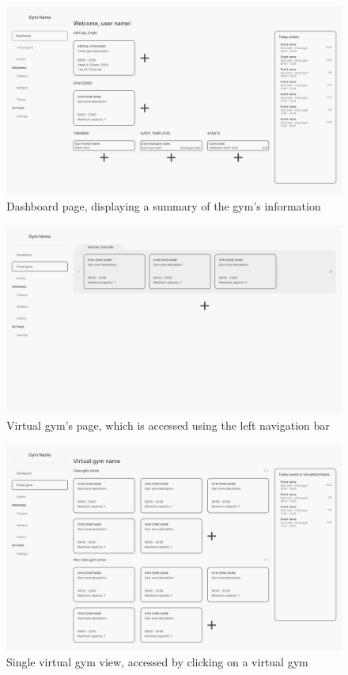 \documentclass[a4paper, 12pt, oneside]{book}
\begin{document}
\begin{figure}[H]
	\centering
	\includegraphics[width=\textwidth]{assets/ui/dashboard.png}
	\caption{Dashboard page, displaying a summary of the gym's information}
\end{figure}
\begin{figure}[H]
	\centering
	\includegraphics[width=\textwidth]{assets/ui/virtual-gyms.png}
	\caption{Virtual gym's page, which is accessed using the left navigation bar}
\end{figure}
\begin{figure}[H]
	\centering
	\includegraphics[width=\textwidth]{assets/ui/virtual-gym.png}
	\caption{Single virtual gym view, accessed by clicking on a virtual gym}
\end{figure}
\end{document}
